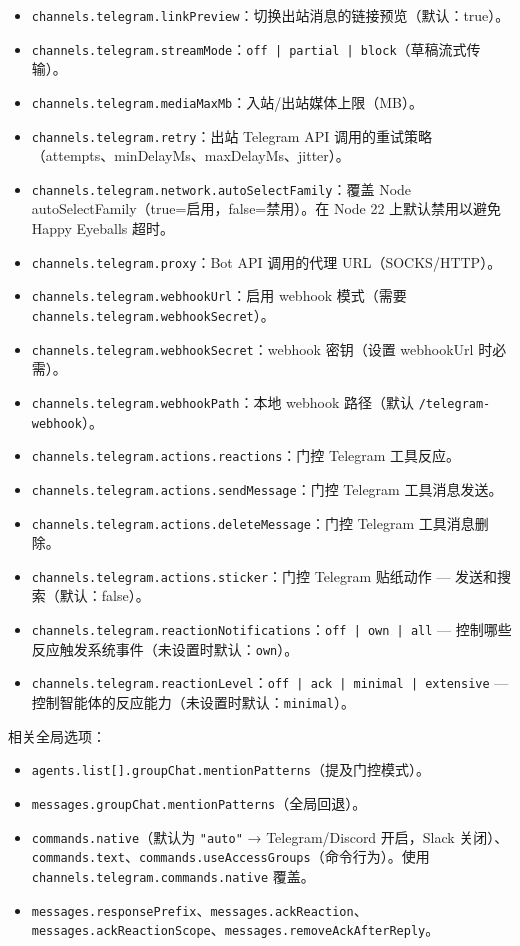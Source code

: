 \begin{itemize}
  \item \texttt{channels.telegram.linkPreview}：切换出站消息的链接预览（默认：true）。
  \item \texttt{channels.telegram.streamMode}：\texttt{off | partial | block}（草稿流式传输）。
  \item \texttt{channels.telegram.mediaMaxMb}：入站/出站媒体上限（MB）。
  \item \texttt{channels.telegram.retry}：出站 Telegram API 调用的重试策略（attempts、minDelayMs、maxDelayMs、jitter）。
  \item \texttt{channels.telegram.network.autoSelectFamily}：覆盖 Node autoSelectFamily（true=启用，false=禁用）。在 Node 22 上默认禁用以避免 Happy Eyeballs 超时。
  \item \texttt{channels.telegram.proxy}：Bot API 调用的代理 URL（SOCKS/HTTP）。
  \item \texttt{channels.telegram.webhookUrl}：启用 webhook 模式（需要 \texttt{channels.telegram.webhookSecret}）。
  \item \texttt{channels.telegram.webhookSecret}：webhook 密钥（设置 webhookUrl 时必需）。
  \item \texttt{channels.telegram.webhookPath}：本地 webhook 路径（默认 \texttt{/telegram-webhook}）。
  \item \texttt{channels.telegram.actions.reactions}：门控 Telegram 工具反应。
  \item \texttt{channels.telegram.actions.sendMessage}：门控 Telegram 工具消息发送。
  \item \texttt{channels.telegram.actions.deleteMessage}：门控 Telegram 工具消息删除。
  \item \texttt{channels.telegram.actions.sticker}：门控 Telegram 贴纸动作 — 发送和搜索（默认：false）。
  \item \texttt{channels.telegram.reactionNotifications}：\texttt{off | own | all} — 控制哪些反应触发系统事件（未设置时默认：\texttt{own}）。
  \item \texttt{channels.telegram.reactionLevel}：\texttt{off | ack | minimal | extensive} — 控制智能体的反应能力（未设置时默认：\texttt{minimal}）。
\end{itemize}


相关全局选项：

\begin{itemize}
  \item \texttt{agents.list[].groupChat.mentionPatterns}（提及门控模式）。
  \item \texttt{messages.groupChat.mentionPatterns}（全局回退）。
  \item \texttt{commands.native}（默认为 \texttt{"auto"} → Telegram/Discord 开启，Slack 关闭）、\texttt{commands.text}、\texttt{commands.useAccessGroups}（命令行为）。使用 \texttt{channels.telegram.commands.native} 覆盖。
  \item \texttt{messages.responsePrefix}、\texttt{messages.ackReaction}、\texttt{messages.ackReactionScope}、\texttt{messages.removeAckAfterReply}。
\end{itemize}



